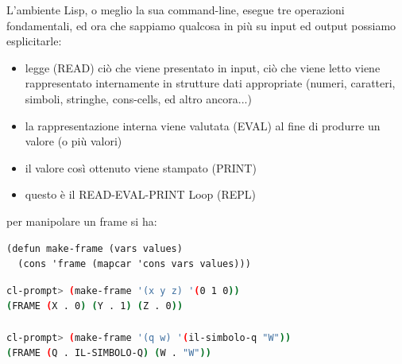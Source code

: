 \documentclass[a4paper,12pt, oneside]{book}
\begin{document}
L'ambiente Lisp, o meglio la sua command-line, esegue tre operazioni fondamentali, ed ora che sappiamo qualcosa in più su input ed output possiamo esplicitarle:
\begin{itemize}
\item legge (READ) ciò che viene presentato in input, ciò che viene letto viene rappresentato internamente in strutture dati appropriate (numeri, caratteri, simboli, stringhe, cons-cells, ed altro ancora...) 
\item la rappresentazione interna viene valutata (EVAL) al fine di produrre un valore (o più valori)
\item il valore così ottenuto viene stampato (PRINT)
\item questo è il READ-EVAL-PRINT Loop (REPL)
\end{itemize}
per manipolare un frame si ha:
\begin{verbatim}
(defun make-frame (vars values)
  (cons 'frame (mapcar 'cons vars values)))
\end{verbatim}
\begin{shaded}
\begin{lstlisting}[language=bash]
cl-prompt> (make-frame '(x y z) '(0 1 0))
(FRAME (X . 0) (Y . 1) (Z . 0))

cl-prompt> (make-frame '(q w) '(il-simbolo-q "W"))
(FRAME (Q . IL-SIMBOLO-Q) (W . "W"))
\end{lstlisting}
\end{shaded}
\end{document}
